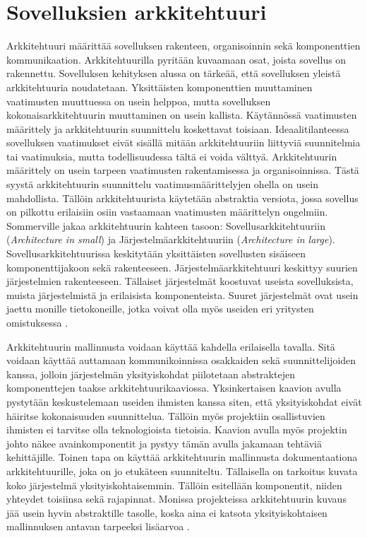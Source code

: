 \documentclass[utf8]{gradu3}
\begin{document}
\section{Sovelluksien arkkitehtuuri}
Arkkitehtuuri määrittää sovelluksen rakenteen, organisoinnin sekä komponenttien kommunikaation. Arkkitehtuurilla pyritään kuvaamaan osat, joista sovellus on rakennettu. Sovelluksen kehityksen alussa on tärkeää, että sovelluksen yleistä arkkitehtuuria noudatetaan. Yksittäisten komponenttien muuttaminen vaatimusten muuttuessa on usein helppoa, mutta sovelluksen kokonaisarkkitehtuurin muuttaminen on usein kallista. Käytännössä vaatimusten määrittely ja arkkitehtuurin suunnittelu koskettavat toisiaan. Ideaalitilanteessa sovelluksen vaatimukset eivät sisällä mitään arkkitehtuuriin liittyviä suunnitelmia tai vaatimuksia, mutta todellisuudessa tältä ei voida välttyä. Arkkitehtuurin määrittely on usein tarpeen vaatimusten rakentamisessa ja organisoinnissa. Tästä syystä arkkitehtuurin suunnittelu vaatimusmäärittelyjen ohella on usein mahdollista. Tällöin arkkitehtuurista käytetään abstraktia versiota, jossa sovellus on pilkottu erilaisiin osiin vastaamaan vaatimusten määrittelyn ongelmiin. Sommerville jakaa arkkitehtuurin kahteen tasoon: Sovellusarkkitehtuuriin (\emph{Architecture in small}) ja Järjestelmäarkkitehtuuriin (\emph{Architecture in large}). Sovellusarkkitehtuurissa keskitytään yksittäisten sovellusten sisäiseen komponenttijakoon sekä rakenteeseen. Järjestelmäarkkitehtuuri keskittyy suurien järjestelmien rakenteeseen. Tällaiset järjestelmät koostuvat useista sovelluksista, muista järjestelmistä ja erilaisista komponenteista. Suuret järjestelmät ovat usein jaettu monille tietokoneille, jotka voivat olla myös useiden eri yritysten omistuksessa \parencite[s. 148]{Sommerville}.

Arkkitehtuurin mallinnusta voidaan käyttää kahdella erilaisella tavalla. Sitä voidaan käyttää auttamaan kommunikoinnissa osakkaiden sekä suunnittelijoiden kanssa, jolloin järjestelmän yksityiskohdat piilotetaan abstraktejen komponenttejen taakse arkkitehtuurikaaviossa. Yksinkertaisen kaavion avulla pystytään keskustelemaan useiden ihmisten kanssa siten, että yksityiskohdat eivät häiritse kokonaisuuden suunnittelua. Tällöin myös projektiin osallistuvien ihmisten ei tarvitse olla teknologioista tietoisia. Kaavion avulla myös projektin johto näkee avainkomponentit ja pystyy tämän avulla jakamaan tehtäviä kehittäjille. Toinen tapa on käyttää arkkitehtuurin mallinnusta dokumentaationa arkkitehtuurille, joka on jo etukäteen suunniteltu. Tällaisella on tarkoitus kuvata koko järjestelmä yksityiskohtaisemmin. Tällöin esitellään komponentit, niiden yhteydet toisiinsa sekä rajapinnat. Monissa projekteissa arkkitehtuurin kuvaus jää usein hyvin abstraktille tasolle, koska aina ei katsota yksityiskohtaisen mallinnuksen antavan tarpeeksi lisäarvoa \parencite[s. 150]{Sommerville}.
\end{document}
